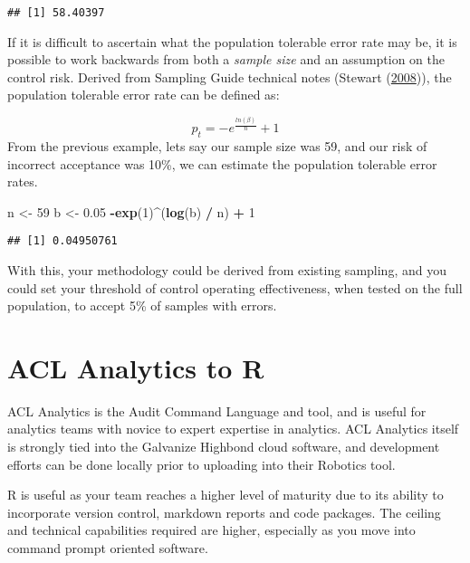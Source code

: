 \documentclass[
]{book}
\newenvironment{Shaded}{\begin{snugshade}}{\end{snugshade}}
\newcommand{\DecValTok}[1]{\textcolor[rgb]{0.00,0.00,0.81}{#1}}
\newcommand{\FloatTok}[1]{\textcolor[rgb]{0.00,0.00,0.81}{#1}}
\newcommand{\KeywordTok}[1]{\textcolor[rgb]{0.13,0.29,0.53}{\textbf{#1}}}
\newcommand{\NormalTok}[1]{#1}
\newcommand{\OperatorTok}[1]{\textcolor[rgb]{0.81,0.36,0.00}{\textbf{#1}}}
\newcommand{\StringTok}[1]{\textcolor[rgb]{0.31,0.60,0.02}{#1}}
\begin{document}
\begin{verbatim}
## [1] 58.40397
\end{verbatim}

If it is difficult to ascertain what the population tolerable error rate may be, it is possible to work backwards from both a \emph{sample size} and an assumption on the control risk. Derived from Sampling Guide technical notes (Stewart (\protect\hyperlink{ref-sampling-technical}{2008})), the population tolerable error rate can be defined as:

\[
p_{t} = -e^\frac{ln(\beta)}{n} + 1
\]
From the previous example, lets say our sample size was 59, and our risk of incorrect acceptance was 10\%, we can estimate the population tolerable error rates.

\begin{Shaded}
\begin{Highlighting}[]
\NormalTok{n <-}\StringTok{ }\DecValTok{59}
\NormalTok{b <-}\StringTok{ }\FloatTok{0.05}
\OperatorTok{-}\KeywordTok{exp}\NormalTok{(}\DecValTok{1}\NormalTok{)}\OperatorTok{^}\NormalTok{(}\KeywordTok{log}\NormalTok{(b) }\OperatorTok{/}\StringTok{ }\NormalTok{n) }\OperatorTok{+}\StringTok{ }\DecValTok{1}
\end{Highlighting}
\end{Shaded}

\begin{verbatim}
## [1] 0.04950761
\end{verbatim}

With this, your methodology could be derived from existing sampling, and you could set your threshold of control operating effectiveness, when tested on the full population, to accept 5\% of samples with errors.

\hypertarget{acl-analytics-to-r}{%
\chapter{ACL Analytics to R}\label{acl-analytics-to-r}}

ACL Analytics is the Audit Command Language and tool, and is useful for analytics teams with novice to expert expertise in analytics. ACL Analytics itself is strongly tied into the Galvanize Highbond cloud software, and development efforts can be done locally prior to uploading into their Robotics tool.

R is useful as your team reaches a higher level of maturity due to its ability to incorporate version control, markdown reports and code packages. The ceiling and technical capabilities required are higher, especially as you move into command prompt oriented software.
\end{document}
